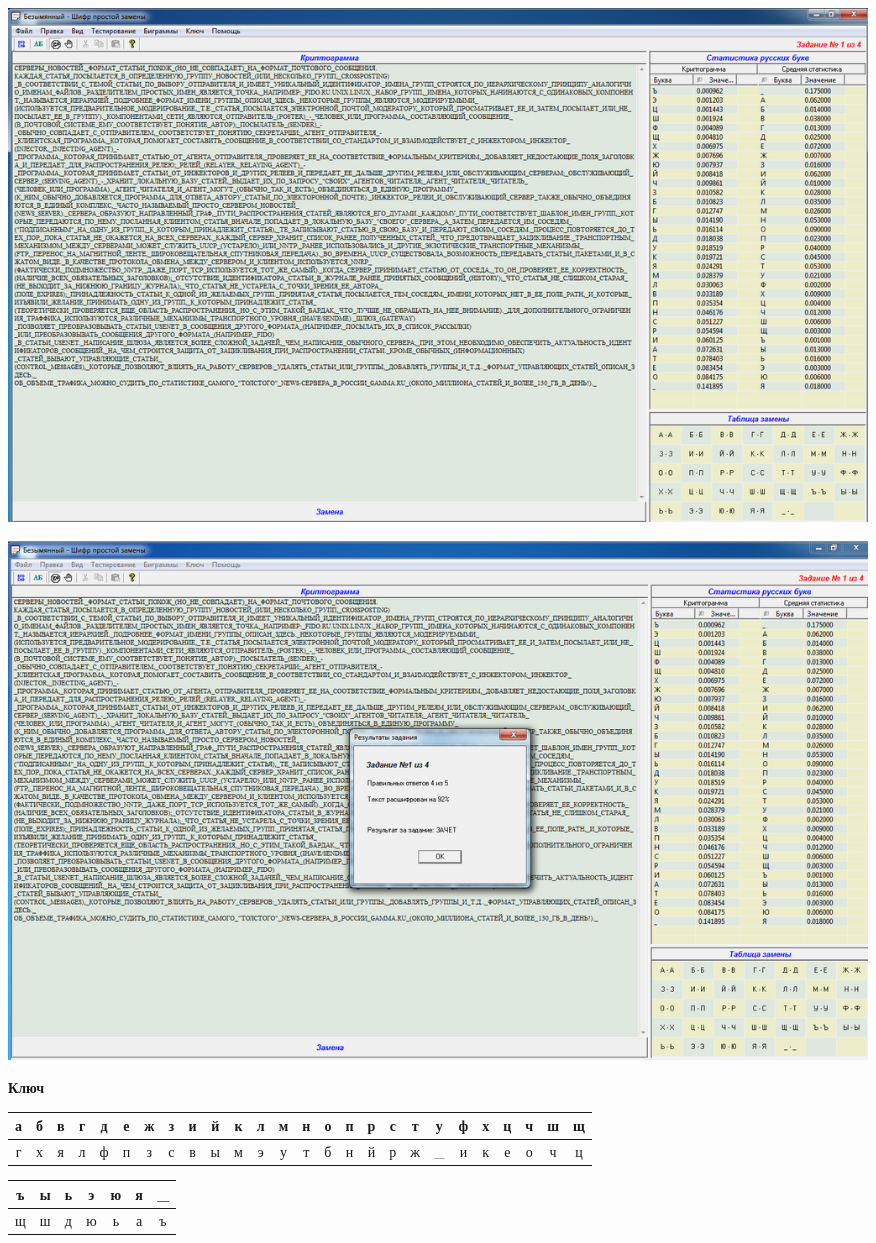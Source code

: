 \documentclass[a4paper,14pt]{extarticle}
\begin{document}
    \begin{center}
        \includegraphics[scale=0.3]{pics/3_1.png}
    \end{center}
    \begin{center}
        \includegraphics[scale=0.3]{pics/3_2.png}
    \end{center}
    \begin{center}
        \textbf{Ключ}
    \end{center}
    \vspace{-3em}
    \begin{center}
        \begin{tabular}{|c|c|c|c|c|c|c|c|c|c|c|c|c|c|c|c|c|c|c|c|c|c|c|c|c|c|}
            \hline
            а & б & в & г & д & е & ж & з & и & й & к & л & м & н & о & п & р & с & т & у & ф & х & ц & ч & ш & щ \\
            \hline
            г & х & я & л & ф & п & з & с & в & ы & м & э & у & т & б & н & й & р & ж &\_ & и & к & е & о & ч & ц \\
            \hline
        \end{tabular}
    \end{center}
    \begin{tabular}{|c|c|c|c|c|c|c|}
        \hline
        ъ & ы & ь & э & ю & я & \_ \\
        \hline
        щ & ш & д & ю & ь & а & ъ \\
        \hline
    \end{tabular}\\
\end{document}

